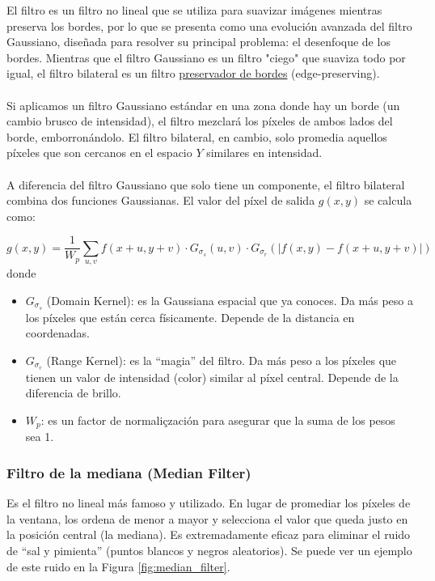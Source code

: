 \noindent
El filtro  es un filtro no lineal que se utiliza para suavizar imágenes mientras preserva los bordes, por lo que se presenta como una evolución avanzada del filtro Gaussiano, diseñada para resolver su principal problema: el desenfoque de los bordes. Mientras que el filtro Gaussiano es un filtro "ciego" que suaviza todo por igual, el filtro bilateral es un filtro \underline{preservador de bordes} (edge-preserving). \\ \\
\noindent
Si aplicamos un filtro Gaussiano estándar en una zona donde hay un borde (un cambio brusco de intensidad), el filtro mezclará los píxeles de ambos lados del borde, emborronándolo. El filtro bilateral, en cambio, solo promedia aquellos píxeles que son cercanos en el espacio $Y$ similares en intensidad. \\ \\
\noindent
A diferencia del filtro Gaussiano que solo tiene un componente, el filtro bilateral combina dos funciones Gaussianas. El valor del píxel de salida $g(x, y)$ se calcula como:

$$g(x, y) = \frac{1}{W_p} \sum_{u, v} f(x+u, y+v) \cdot G_{\sigma_s}(u,v) \cdot G_{\sigma_r}(| f(x,y) - f(x+u,y+v) |)$$
donde 
\begin{itemize}
    \item $G_{\sigma_s}$ (Domain Kernel): es la Gaussiana espacial que ya conoces. Da más peso a los píxeles que están cerca físicamente. Depende de la distancia en coordenadas.
    \item $G_{\sigma_r}$ (Range Kernel): es la ``magia'' del filtro. Da más peso a los píxeles que tienen un valor de intensidad (color) similar al píxel central. Depende de la diferencia de brillo.
    \item $W_p$: es un factor de normaliçzación para asegurar que la suma de los pesos sea 1.
\end{itemize}


\subsubsection{Filtro de la mediana (Median Filter)}
\noindent
Es el filtro no lineal más famoso y utilizado. En lugar de promediar los píxeles de la ventana, los ordena de menor a mayor y selecciona el valor que queda justo en la posición central (la mediana). Es extremadamente eficaz para eliminar el ruido de ``sal y pimienta'' (puntos blancos y negros aleatorios). Se puede ver un ejemplo de este ruido en la Figura \ref{fig:median_filter}.

